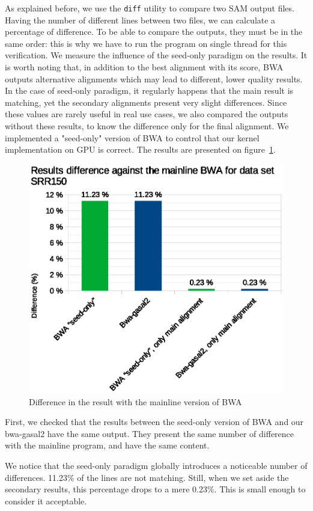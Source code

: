 
As explained before, we use the \verb|diff| utility to compare two SAM output files. Having the number of different lines between two files, we can calculate a percentage of difference. To be able to compare the outputs, they must be in the same order: this is why we have to run the program on single thread for this verification. We measure the influence of the seed-only paradigm on the results. It is worth noting that, in addition to the best alignment with its score, BWA outputs alternative alignments which may lead to different, lower quality results. In the case of seed-only paradigm, it regularly happens that the main result is matching, yet the secondary alignments present very slight differences. Since these values are rarely useful in real use cases, we also compared the outputs without these results, to know the difference only for the final alignment. We implemented a "seed-only" version of BWA to control that our kernel implementation on GPU is correct. The results are presented on figure~\ref{fig:result-diff-srr150}.

\begin{figure}[h!]
	\centering
	\includegraphics[width=1\linewidth]{srr150/result-diff-srr150}
	\caption{Difference in the result with the mainline version of BWA}
	\label{fig:result-diff-srr150}
\end{figure}

First, we checked that the results between the seed-only version of BWA and our bwa-gasal2 have the same output. They present the same number of difference with the mainline program, and have the same content.

We notice that the seed-only paradigm globally introduces a noticeable number of differences. 11.23\% of the lines are not matching. Still, when we set aside the secondary results, this percentage drops to a mere 0.23\%. This is small enough to consider it acceptable.


